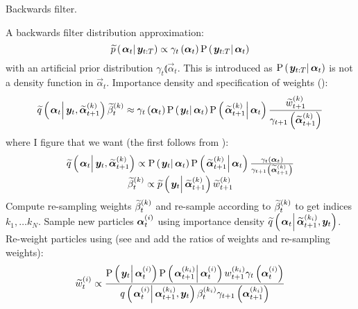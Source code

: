 \begin{algorithm}
\caption{Backwards filter.}\label{alg:backward}
\begin{algorithmic}[1]\raggedright
\INPUT
\Statex A backwards filter distribution approximation:
\begin{equation}
	\propAproxC{\vec{\alpha}_t}{\vec{y}_{t:T}} \propto \gamma_t \Lparen{\vec{\alpha}_t}\propC{\vec{y}_{t:T}}{\vec{\alpha}_t}
\end{equation} 
\Statex with an  artificial prior distribution $\gamma_t \Lparen{\vec{\alpha}_t}$. This is introduced as $\propC{\vec{y}_{t:T}}{\vec{\alpha}_t}$ is not a density function in $\vec{\alpha}_t$.
\Statex Importance density and specification of weights {\footnotesize (\citet[page 451  -- maybe look in the example in the appendix]{fearnhead10})}:
\Statex\begin{equation}
	\IDAproxC{\vec{\alpha}_t}{\vec{y}_t, \particB{\vec{\alpha}}{t + 1}{k}}\particB{\beta}{t}{k} \approx %
		\gamma_t\Lparen{\vec{\alpha}_t}
		\propC{\vec{y}_t}{\vec{\alpha}_t}
		\propC{\particB{\vec{\alpha}}{t + 1}{k}}{\vec{\alpha}_t}
		\frac{\particB{w}{t + 1}{k}}{\gamma_{t + 1}\Lparen{\particB{\vec{\alpha}}{t + 1}{k}}}
\end{equation}
\Statex where I figure that we want {\footnotesize (the first follows from \citet[page 74]{briers10})}:
\Statex\begin{equation}\begin{matrix}
	\IDAproxC{\vec{\alpha}_t}{\vec{y}_t, \particB{\vec{\alpha}}{t + 1}{k}} \propto %
		\propC{\vec{y}_t}{\vec{\alpha}_t}
		\propC{\particB{\vec{\alpha}}{t + 1}{k}}{\vec{\alpha}_t}
		\frac{\gamma_t\Lparen{\vec{\alpha}_t}}{\gamma_{t + 1}\Lparen{\particB{\vec{\alpha}}{t + 1}{k}}} \\
	\particB{\beta}{t}{k} \propto %
		 \propAproxC{\vec{y}_t}{\particB{\vec{\alpha}}{t + 1}{k}}\particB{w}{t + 1}{k}
\end{matrix}\end{equation}
\State Compute re-sampling weights $\widetilde{\beta}_{t}^{\left( k\right)}$ and re-sample according to $\widetilde{\beta}_{t}^{\left( k\right)}$ to get indices $k_1,\dots k_N$.
\EndProcedure
%
\State Sample new particles $\bm{\alpha}_{t}^{\left( i\right)}$ using importance density $\IDAproxC{\vec{\alpha}_t}{\particB{\vec{\alpha}}{t + 1}{k_i}, \vec{y}_t}$.
\EndProcedure
%
\State Re-weight particles using {\footnotesize (see \citet[page 72]{briers10} and add the ratios of weights and re-sampling weights)}:
\StateX \begin{equation}\label{eqn:backwardWeight}
	\particB{w}{t}{i} \propto \frac{
		\propC{\vec{y}_t}{\partic{\vec{\alpha}}{t}{i}}
		\propC{\partic{\vec{\alpha}}{t + 1}{k_i}}{\partic{\vec{\alpha}}{t}{i}}
		\partic{w}{t + 1}{k_i}
		\gamma_t\Lparen{\partic{\vec{\alpha}}{t}{i}}
	}{ %
		\IDC{\partic{\vec{\alpha}}{t}{i}}{\partic{\vec{\alpha}}{t + 1}{k_i}, \vec{y}_t}
		\partic{\beta}{t}{k_i}
		\gamma_{t + 1}\Lparen{\partic{\vec{\alpha}}{t + 1}{k_i}}
	}
\end{equation}
\EndProcedure
\EndFor
\end{algorithmic}
\end{algorithm}
